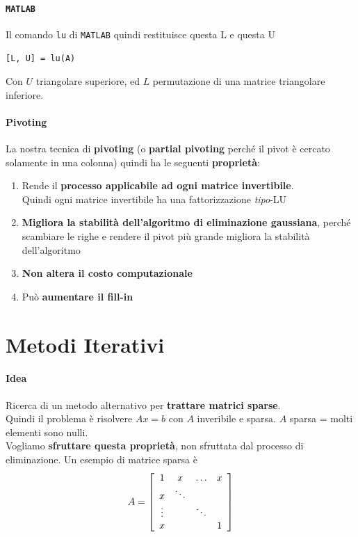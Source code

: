 \documentclass[10pt]{book}
\begin{document}
\paragraph{\texttt{MATLAB}} Il comando \texttt{lu} di \texttt{MATLAB} quindi restituisce questa L e questa U
\begin{lstlisting}
[L, U] = lu(A)
\end{lstlisting}
Con $U$ triangolare superiore, ed $L$ permutazione di una matrice triangolare inferiore.
\paragraph{Pivoting} La nostra tecnica di \textbf{pivoting} (o \textbf{partial pivoting} perché il pivot è cercato solamente in una colonna) quindi ha le seguenti \textbf{proprietà}:
\begin{enumerate}
	\item Rende il \textbf{processo applicabile ad ogni matrice invertibile}.\\
	Quindi ogni matrice invertibile ha una fattorizzazione \textit{tipo}-LU
	\item \textbf{Migliora la stabilità dell'algoritmo di eliminazione gaussiana}, perché scambiare le righe e rendere il pivot più grande migliora la stabilità dell'algoritmo
	\item \textbf{Non altera il costo computazionale}
	\item Può \textbf{aumentare il fill-in}
\end{enumerate}
\section{Metodi Iterativi}
\paragraph{Idea} Ricerca di un metodo alternativo per \textbf{trattare matrici sparse}.\\
Quindi il problema è risolvere $Ax = b$ con $A$ inveribile e sparsa. $A$ sparsa = molti elementi sono nulli.\\
Vogliamo \textbf{sfruttare questa proprietà}, non sfruttata dal processo di eliminazione. Un esempio di matrice sparsa è
$$A = \left[
\begin{array}{c c c c}
1 & x & \ldots & x \\
x & \ddots \\
\vdots & & \ddots & \\
x & & & 1
\end{array}
\right] $$
\end{document}
